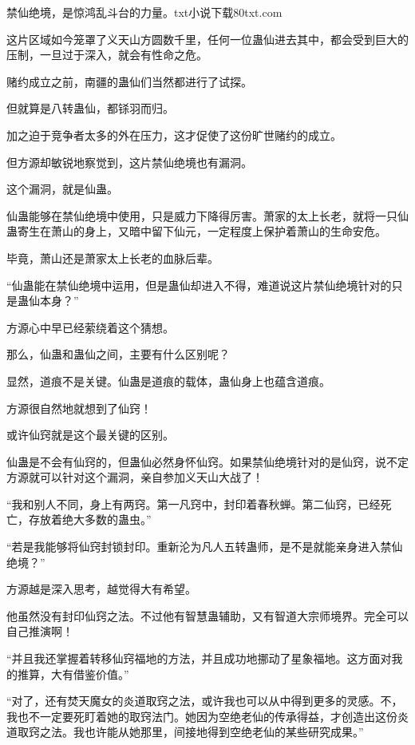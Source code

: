 
\begin{this_body}

禁仙绝境，是惊鸿乱斗台的力量。txt小说下载80txt.com

这片区域如今笼罩了义天山方圆数千里，任何一位蛊仙进去其中，都会受到巨大的压制，一旦过于深入，就会有性命之危。

赌约成立之前，南疆的蛊仙们当然都进行了试探。

但就算是八转蛊仙，都铩羽而归。

加之迫于竞争者太多的外在压力，这才促使了这份旷世赌约的成立。

但方源却敏锐地察觉到，这片禁仙绝境也有漏洞。

这个漏洞，就是仙蛊。

仙蛊能够在禁仙绝境中使用，只是威力下降得厉害。萧家的太上长老，就将一只仙蛊寄生在萧山的身上，又暗中留下仙元，一定程度上保护着萧山的生命安危。

毕竟，萧山还是萧家太上长老的血脉后辈。

“仙蛊能在禁仙绝境中运用，但是蛊仙却进入不得，难道说这片禁仙绝境针对的只是蛊仙本身？”

方源心中早已经萦绕着这个猜想。

那么，仙蛊和蛊仙之间，主要有什么区别呢？

显然，道痕不是关键。仙蛊是道痕的载体，蛊仙身上也蕴含道痕。

方源很自然地就想到了仙窍！

或许仙窍就是这个最关键的区别。

仙蛊是不会有仙窍的，但蛊仙必然身怀仙窍。如果禁仙绝境针对的是仙窍，说不定方源就可以针对这个漏洞，亲自参加义天山大战了！

“我和别人不同，身上有两窍。第一凡窍中，封印着春秋蝉。第二仙窍，已经死亡，存放着绝大多数的蛊虫。”

“若是我能够将仙窍封锁封印。重新沦为凡人五转蛊师，是不是就能亲身进入禁仙绝境？”

方源越是深入思考，越觉得大有希望。

他虽然没有封印仙窍之法。不过他有智慧蛊辅助，又有智道大宗师境界。完全可以自己推演啊！

“并且我还掌握着转移仙窍福地的方法，并且成功地挪动了星象福地。这方面对我的推算，大有借鉴价值。”

“对了，还有焚天魔女的炎道取窍之法，或许我也可以从中得到更多的灵感。不，我也不一定要死盯着她的取窍法门。她因为空绝老仙的传承得益，才创造出这份炎道取窍之法。我也许能从她那里，间接地得到空绝老仙的某些研究成果。”


\end{this_body}
